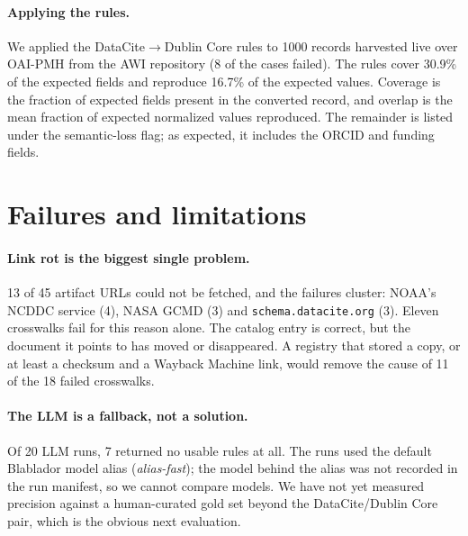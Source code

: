 \documentclass[10pt,twocolumn,a4paper]{extarticle}
\begin{document}
\paragraph{Applying the rules.} We applied the DataCite$\to$Dublin Core rules
to 1000 records harvested live over OAI-PMH from the AWI repository (8 of the
cases failed). The rules cover 30.9\% of the expected fields and
reproduce 16.7\% of the expected values. Coverage is the fraction of
expected fields present in the converted record, and overlap is the mean
fraction of expected normalized values reproduced. The remainder is
listed under the semantic-loss flag; as expected, it includes the ORCID and
funding fields.


\section{Failures and limitations}\label{sec:discussion}

\paragraph{Link rot is the biggest single problem.} 13 of 45 artifact
URLs could not be fetched, and the failures cluster: NOAA's NCDDC service (4),
NASA GCMD (3) and \texttt{schema.datacite.org} (3). Eleven crosswalks fail
for this reason alone. The catalog entry is correct, but the document it points
to has moved or disappeared. A registry that stored a copy, or at least a
checksum and a Wayback Machine link, would remove the cause of 11 of the 18
failed crosswalks.

\paragraph{The LLM is a fallback, not a solution.} Of 20 LLM runs, 7
returned no usable rules at all. The runs used the default Blablador model
alias (\emph{alias-fast}); the model behind the alias was not recorded in
the run manifest, so we cannot compare models. We have not yet measured
precision against a human-curated gold set beyond the DataCite/Dublin Core
pair, which is the obvious next evaluation.
\end{document}
